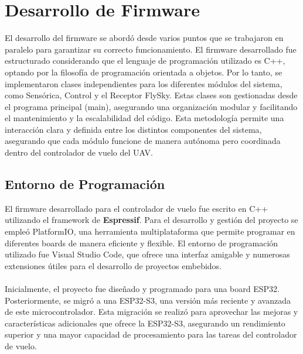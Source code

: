 \section{Desarrollo de Firmware}


El desarrollo del firmware se abordó desde varios puntos que se trabajaron en paralelo para garantizar su correcto funcionamiento. El firmware desarrollado fue estructurado considerando que el lenguaje de programación utilizado es C++, optando por la filosofía de programación orientada a objetos. Por lo tanto, se implementaron clases independientes para los diferentes módulos del sistema, como Sensórica, Control y el Receptor FlySky. Estas clases son gestionadas desde el programa principal (main), asegurando una organización modular y facilitando el mantenimiento y la escalabilidad del código. Esta metodología permite una interacción clara y definida entre los distintos componentes del sistema, asegurando que cada módulo funcione de manera autónoma pero coordinada dentro del controlador de vuelo del UAV.

\subsection{Entorno de Programación}

El firmware desarrollado para el controlador de vuelo fue escrito en C++ utilizando el framework de \textbf{Espressif}. Para el desarrollo y gestión del proyecto se empleó PlatformIO, una herramienta multiplataforma que permite programar en diferentes boards de manera eficiente y flexible. El entorno de programación utilizado fue Visual Studio Code, que ofrece una interfaz amigable y numerosas extensiones útiles para el desarrollo de proyectos embebidos. \\ \\

Inicialmente, el proyecto fue diseñado y programado para una board ESP32. Posteriormente, se migró a una ESP32-S3, una versión más reciente y avanzada de este microcontrolador. Esta migración se realizó para aprovechar las mejoras y características adicionales que ofrece la ESP32-S3, asegurando un rendimiento superior y una mayor capacidad de procesamiento para las tareas del controlador de vuelo.

